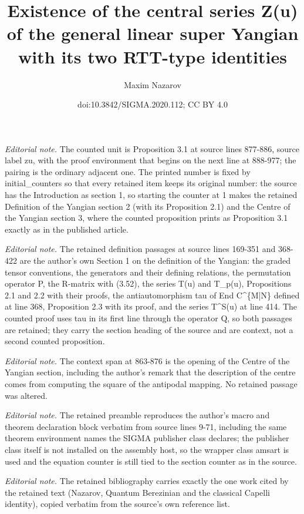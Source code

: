 \documentclass[10pt,a4paper]{amsart}
\title{Existence of the central series Z(u) of the general linear super Yangian with its two RTT-type identities}
\author{Maxim Nazarov}
\date{doi:10.3842/SIGMA.2020.112; CC BY 4.0}
\numberwithin{equation}{section}
\begin{document}
\maketitle
\setcounter{section}{1}
\noindent\textit{Editorial note.} The counted unit is Proposition 3.1 at source lines 877-886, source label zu, with the proof environment that begins on the next line at 888-977; the pairing is the ordinary adjacent one. The printed number is fixed by initial\_counters so that every retained item keeps its original number: the source has the Introduction as section 1, so starting the counter at 1 makes the retained Definition of the Yangian section 2 (with its Proposition 2.1) and the Centre of the Yangian section 3, where the counted proposition prints as Proposition 3.1 exactly as in the published article.\par\medskip
\noindent\textit{Editorial note.} The retained definition passages at source lines 169-351 and 368-422 are the author's own Section 1 on the definition of the Yangian: the graded tensor conventions, the generators and their defining relations, the permutation operator P, the R-matrix with (3.52), the series T(u) and T\_p(u), Propositions 2.1 and 2.2 with their proofs, the antiautomorphism tau of End C\textasciicircum{}\{M|N\} defined at line 368, Proposition 2.3 with its proof, and the series T\textasciicircum{}S(u) at line 414. The counted proof uses tau in its first line through the operator Q, so both passages are retained; they carry the section heading of the source and are context, not a second counted proposition.\par\medskip
\noindent\textit{Editorial note.} The context span at 863-876 is the opening of the Centre of the Yangian section, including the author's remark that the description of the centre comes from computing the square of the antipodal mapping. No retained passage was altered.\par\medskip
\noindent\textit{Editorial note.} The retained preamble reproduces the author's macro and theorem declaration block verbatim from source lines 9-71, including the same theorem environment names the SIGMA publisher class declares; the publisher class itself is not installed on the assembly host, so the wrapper class amsart is used and the equation counter is still tied to the section counter as in the source.\par\medskip
\noindent\textit{Editorial note.} The retained bibliography carries exactly the one work cited by the retained text (Nazarov, Quantum Berezinian and the classical Capelli identity), copied verbatim from the source's own reference list.\par\medskip
\end{document}
